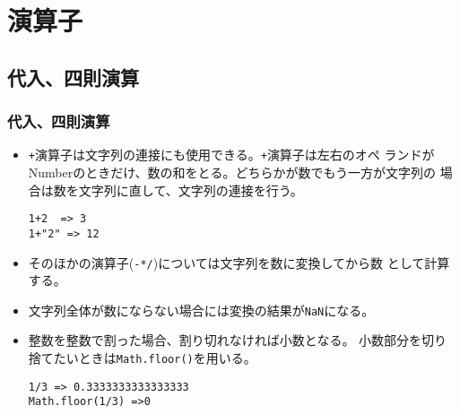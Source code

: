 \section{演算子}
\subsection{代入、四則演算}
\begin{frame}[containsverbatim]
 \frametitle{代入、四則演算}
\begin{itemize}
 \item \Verb-+-演算子は文字列の連接にも使用できる。\Verb-+-演算子は左右のオペ
ランドがNumberのときだけ、数の和をとる。どちらかが数でもう一方が文字列の
場合は数を文字列に直して、文字列の連接を行う。
\begin{Verbatim}
1+2  => 3
1+"2" => 12
\end{Verbatim}
 \item そのほかの演算子(\Verb+-*/+)については文字列を数に変換してから数
       として計算する。
 \item 文字列全体が数にならない場合には変換の結果が\Verb+NaN+になる。

 \item 整数を整数で割った場合、割り切れなければ小数となる。
       小数部分を切り捨てたいときは\Verb+Math.floor()+を用いる。
\begin{Verbatim}
1/3 => 0.3333333333333333
Math.floor(1/3) =>0
\end{Verbatim}
\end{itemize}
\end{frame}
